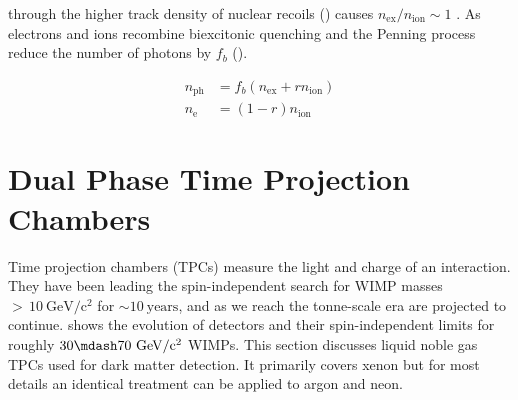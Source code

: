\noindent through the higher track density of nuclear recoils ()  causes
$n_{\mathrm{ex}} / n_{\mathrm{ion}} \sim 1$ .  As electrons and ions
recombine biexcitonic quenching and the Penning process reduce the number of photons by $f_b$ ().

\begin{subequations}
\begin{align}
n_{\mathrm{ph}} &= f_b ( n_{\mathrm{ex}} + rn_{\mathrm{ion}} ) \\
n_{\mathrm{e}} &= (1 - r)n_{\mathrm{ion}}
\end{align}
\end{subequations}



\section{Dual Phase Time Projection Chambers}
\label{sec:tpcs}
Time projection chambers (TPCs) measure the light and charge of an interaction.  They have been leading the
spin-independent search for WIMP masses ${>}\, 10\ \mathrm{GeV/c^2}$ for ${\sim}10\ \mathrm{years}$, and as we reach the tonne-scale era
are projected to continue.   shows the evolution of detectors and their spin-independent limits for roughly
$30 \mdash 70\ \mathrm{GeV/c^2}$ WIMPs.  This section discusses liquid noble gas TPCs used for dark matter detection.  It primarily covers
xenon but for most details an identical treatment can be applied to argon and neon.

